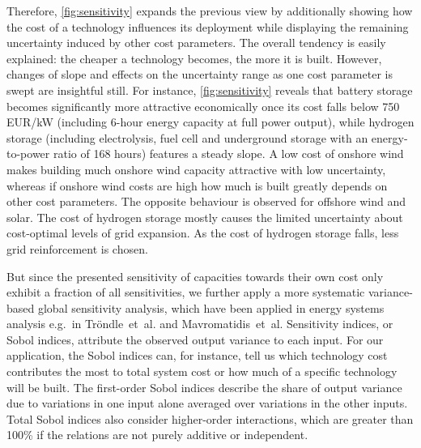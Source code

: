 Therefore, \cref{fig:sensitivity} expands the previous view by additionally
showing how the cost of a technology influences its deployment while displaying
the remaining uncertainty induced by other cost parameters. The overall tendency
is easily explained: the cheaper a technology becomes, the more it is built.
However, changes of slope and effects on the uncertainty range as one cost
parameter is swept are insightful still. For instance, \cref{fig:sensitivity}
reveals that battery storage becomes significantly more attractive economically
once its cost falls below 750 EUR/kW (including 6-hour energy capacity at full
power output), while hydrogen storage (including electrolysis, fuel cell and
underground storage with an energy-to-power ratio of 168 hours) features a
steady slope. A low cost of onshore wind makes building much onshore wind
capacity attractive with low uncertainty, whereas if onshore wind costs are high
how much is built greatly depends on other cost parameters. The opposite
behaviour is observed for offshore wind and solar. The cost of hydrogen storage
mostly causes the limited uncertainty about cost-optimal levels of grid
expansion. As the cost of hydrogen storage falls, less grid reinforcement is
chosen.

But since the presented sensitivity of capacities towards their own cost only
exhibit a fraction of all sensitivities, we further apply a more systematic
variance-based global sensitivity analysis, which have been applied in energy
systems analysis e.g.~in Tröndle~et~al.\cite{trondle_trade-offs_2020} and
Mavromatidis~et~al.\cite{mavromatidis_uncertainty_2018} Sensitivity indices, or
Sobol indices, attribute the observed output variance to each input.
\cite{sudret_global_2008} For our application, the Sobol indices can, for
instance, tell us which technology cost contributes the most to total system
cost or how much of a specific technology will be built. The first-order Sobol
indices describe the share of output variance due to variations in one input
alone averaged over variations in the other inputs. Total Sobol indices also
consider higher-order interactions, which are greater than 100\% if the
relations are not purely additive or independent.

